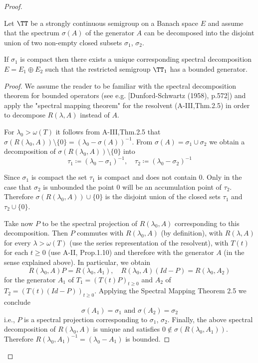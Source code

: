 \begin{proof}
\begin{theorem}\label{thm:a3-3.3}
	
	Let $\TT$ be a strongly continuous semigroup on a Banach space $E$ and assume that the spectrum $\sigma(A)$ of the generator $A$ can be decomposed into the disjoint union of two non-empty closed subsets $\sigma_{1}$, $\sigma_{2}$.
	
	If $\sigma_{1}$ is compact then there exists a unique corresponding spectral decomposition $E = E_{1} \oplus E_{2}$ such that the restricted semigroup $\TT_{1}$ has a bounded generator.
\end{theorem}

\begin{proof}
	We assume the reader to be familiar with the spectral decomposition theorem for bounded operators (see e.g. [Dunford-Schwartz (1958), p.572]) and apply the "spectral mapping theorem" for the resolvent (A-III,Thm.2.5) in order to decompose $R(\lambda,A)$ instead of $A$.
	
	For $\lambda_{0} > \omega(T)$ it follows from A-III,Thm.2.5 that $\sigma(R(\lambda_{0},A)) \setminus \{0\} = (\lambda_{0} - \sigma(A))^{-1}$.
	From $\sigma(A) = \sigma_{1} \cup \sigma_{2}$ we obtain a decomposition of $\sigma(R(\lambda_{0},A)) \setminus \{0\}$ into
	\[
	\tau_{1} \coloneqq (\lambda_{0}-\sigma_{1})^{-1}, \quad \tau_{2} \coloneqq (\lambda_{0}-\sigma_{2})^{-1}
	\]
	
	Since $\sigma_{1}$ is compact the set $\tau_{1}$ is compact and does not contain $0$.
	Only in the case that $\sigma_{2}$ is unbounded the point $0$ will be an accumulation point of $\tau_{2}$.
	Therefore $\sigma(R(\lambda_{0},A)) \cup \{0\}$ is the disjoint union of the closed sets $\tau_{1}$ and $\tau_{2} \cup \{0\}$.
	
	Take now $P$ to be the spectral projection of $R(\lambda_{0},A)$ corresponding to this decomposition.
	Then $P$ commutes with $R(\lambda_{0},A)$ (by definition), with $R(\lambda,A)$ for every $\lambda > \omega(T)$ (use the series representation of the resolvent), with $T(t)$ for each $t \geq 0$ (use A-II, Prop.1.10) and therefore with the generator $A$ (in the sense explained above).
	In particular, we obtain
	\[
	R(\lambda_{0},A)P = R(\lambda_{0},A_{1}), \quad R(\lambda_{0},A)(Id-P) = R(\lambda_{0},A_{2})
	\]
	for the generator $A_{1}$ of $T_{1} = (T(t)P)_{t \geq 0}$ and $A_{2}$ of $T_{2} = (T(t)(Id-P))_{t \geq 0}$.
	Applying the Spectral Mapping Theorem 2.5 we conclude
	\[
	\sigma(A_{1}) = \sigma_{1} \text{ and } \sigma(A_{2}) = \sigma_{2}
	\]
	i.e., $P$ is a spectral projection corresponding to $\sigma_{1}$, $\sigma_{2}$.
	Finally, the above spectral decomposition of $R(\lambda_{0},A)$ is unique and satisfies $0 \notin \sigma(R(\lambda_{0},A_{1}))$.
	Therefore $R(\lambda_{0},A_{1})^{-1} = (\lambda_{0}-A_{1})$ is bounded.
\end{proof}



\end{proof}
